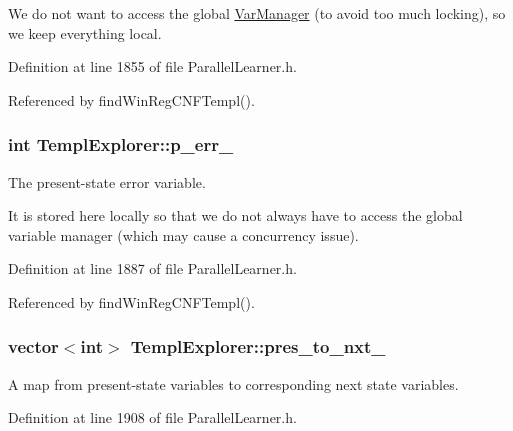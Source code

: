 We do not want to access the global \hyperlink{classVarManager}{Var\-Manager} (to avoid too much locking), so we keep everything local. 

Definition at line 1855 of file Parallel\-Learner.\-h.



Referenced by find\-Win\-Reg\-C\-N\-F\-Templ().

\hypertarget{classTemplExplorer_ad538a0e66b7c0a52de76eea33da7db94}{
\subsubsection[{p\-\_\-err\-\_\-}]{\setlength{\rightskip}{0pt plus 5cm}int Templ\-Explorer\-::p\-\_\-err\-\_\-\hspace{0.3cm}{\ttfamily [protected]}}}\label{classTemplExplorer_ad538a0e66b7c0a52de76eea33da7db94}


The present-\/state error variable. 

It is stored here locally so that we do not always have to access the global variable manager (which may cause a concurrency issue). 

Definition at line 1887 of file Parallel\-Learner.\-h.



Referenced by find\-Win\-Reg\-C\-N\-F\-Templ().

\hypertarget{classTemplExplorer_a5293c24738857c9af8228336dd675833}{
\subsubsection[{pres\-\_\-to\-\_\-nxt\-\_\-}]{\setlength{\rightskip}{0pt plus 5cm}vector$<$int$>$ Templ\-Explorer\-::pres\-\_\-to\-\_\-nxt\-\_\-\hspace{0.3cm}{\ttfamily [protected]}}}\label{classTemplExplorer_a5293c24738857c9af8228336dd675833}


A map from present-\/state variables to corresponding next state variables. 



Definition at line 1908 of file Parallel\-Learner.\-h.



